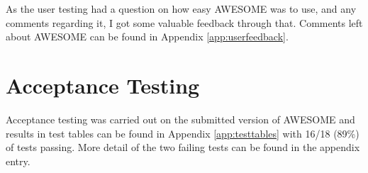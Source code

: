 	As the user testing had a question on how easy \ac{AWESOME} was to use, and any comments regarding it, I got some valuable feedback through that.
	Comments left about \ac{AWESOME} can be found in Appendix \autoref{app:userfeedback}.
	
	\section{Acceptance Testing}
	
	Acceptance testing was carried out on the submitted version of \ac{AWESOME} and results in test tables can be found in Appendix \autoref{app:testtables} with 16/18 (89\%) of tests passing.
	More detail of the two failing tests can be found in the appendix entry.
